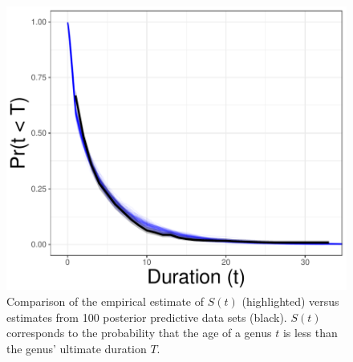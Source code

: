 \documentclass[11pt]{article}
\begin{document}
\begin{figure}[ht]
  \centering
  \includegraphics[height = 0.5\textheight,width=\textwidth,keepaspectratio=true]{figure/survival_curves_cweib_cens}
  \caption{Comparison of the empirical estimate of \(S(t)\) (highlighted) versus estimates from 100 posterior predictive data sets (black). \(S(t)\) corresponds to the probability that the age of a genus \(t\) is less than the genus' ultimate duration \(T\). }
  \label{fig:surv}
\end{figure}
\end{document}
